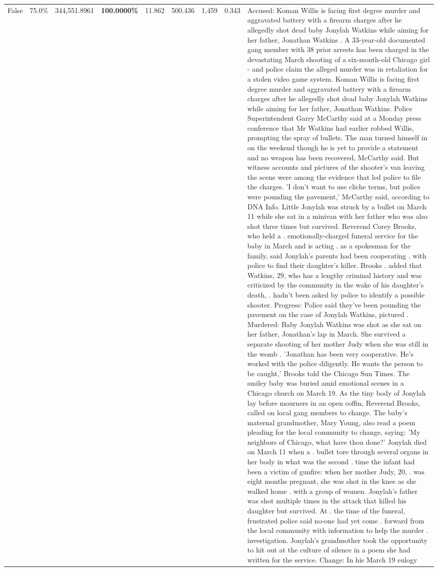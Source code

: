\begin{table}[H]
\begin{tabular}{lllrlllll}
False & 75.0\% & 344,551.8961 & \bfseries \color{red} 100.0000\% & 11.862 & 500.436 & 1,459 & 0.343 & Accused: Koman Willis is facing first degree murder and aggravated battery with a firearm charges after he allegedly shot dead baby Jonylah Watkins while aiming for her father, Jonathan Watkins . A 33-year-old documented gang member with 38 prior arrests has been charged in the devastating March shooting of a six-month-old Chicago girl - and police claim the alleged murder was in retaliation for a stolen video game system. Koman Willis is facing first degree murder and aggravated battery with a firearm charges after he allegedly shot dead baby Jonylah Watkins while aiming for her father, Jonathan Watkins. Police Superintendent Garry McCarthy said at a Monday press conference that Mr Watkins had earlier robbed Willis, prompting the spray of bullets. The man turned himself in on the weekend though he is yet to provide a statement and no weapon has been recovered, McCarthy said. But witness accounts and pictures of the shooter's van leaving the scene were among the evidence that led police to file the charges. 'I don't want to use cliche terms, but police were pounding the pavement,' McCarthy said, according to DNA Info. Little Jonylah was struck by a bullet on March 11 while she sat in a minivan with her father who was also shot three times but survived. Reverend Corey Brooks, who held a . emotionally-charged funeral service for the baby in March and is acting . as a spokesman for the family, said Jonylah's parents had been cooperating . with police to find their daughter's killer. Brooks . added that Watkins, 29, who has a lengthy criminal history and was criticized by the community in the wake of his daughter's death, . hadn't been asked by police to identify a possible shooter. Progress: Police said they've been pounding the pavement on the case of Jonylah Watkins, pictured . Murdered: Baby Jonylah Watkins was shot as she sat on her father, Jonathan's lap in March. She survived a separate shooting of her mother Judy when she was still in the womb . 'Jonathan has been very cooperative. He's worked with the police diligently. He wants the person to be caught,' Brooks told the Chicago Sun Times. The smiley baby was buried amid emotional scenes in a Chicago church on March 19. As the tiny body of Jonylah lay before mourners in an open coffin, Reverend Brooks, called on local gang members to change. The baby's maternal grandmother, Mary Young, also read a poem pleading for the local community to change, saying: 'My neighbors of Chicago, what have thou done?' Jonylah died on March 11 when a . bullet tore through several organs in her body in what was the second . time the infant had been a victim of gunfire: when her mother Judy, 20, . was eight months pregnant, she was shot in the knee as she walked home . with a group of women. Jonylah's father was shot multiple times in the attack that killed his daughter but survived. At . the time of the funeral, frustrated police said no-one had yet come . forward from the local community with information to help the murder . investigation. Jonylah's grandmother took the opportunity to hit out at the culture of silence in a poem she had written for the service. Change: In his March 19 eulogy 
\end{tabular}
\end{table}
